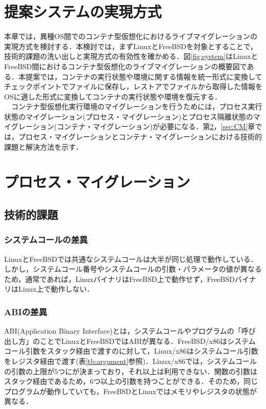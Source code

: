 \documentclass[11pt]{jarticle}
\begin{document}
\section{提案システムの実現方式}
\label{sec:suggest}
本章では，異種OS間でのコンテナ型仮想化におけるライブマイグレーションの実現方式を検討する．本検討では，まずLinuxとFreeBSDを対象とすることで，技術的課題の洗い出しと実現方式の有効性を確かめる．図\ref{fig:system}はLinuxとFreeBSD間におけるコンテナ型仮想化のライブマイグレーションの概要図である．本提案では，コンテナの実行状態や環境に関する情報を統一形式に変換してチェックポイントでファイルに保存し，レストアでファイルから取得した情報をOSに適した形式に変換してコンテナの実行状態や環境を復元する．\\
　コンテナ型仮想化実行環境のマイグレーションを行うためには，プロセス実行状態のマイグレーション(プロセス・マイグレーション)とプロセス隔離状態のマイグレーション(コンテナ・マイグレーション)が必要になる．第\ref{sec:PM}，\ref{sec:CM}章では，プロセス・マイグレーションとコンテナ・マイグレーションにおける技術的課題と解決方法を示す．


\section{プロセス・マイグレーション}
\label{sec:PM}
\subsection{技術的課題}
\subsubsection{システムコールの差異}
LinuxとFreeBSDでは共通なシステムコールは大半が同じ処理で動作している．しかし，システムコール番号やシステムコールの引数・パラメータの値が異なるため，通常であれば，LinuxバイナリはFreeBSD上で動作せず，FreeBSDバイナリはLinux上で動作しない．
\subsubsection{ABIの差異}
ABI(Application Binary Interface)とは，システムコールやプログラムの「呼び出し方」のことでLinuxとFreeBSDではABIが異なる．FreeBSD/x86はシステムコール引数をスタック経由で渡すのに対して，Linux/x86はシステムコール引数をレジスタ経由で渡す(表\ref{tb:argument}参照)\cite{hello}．Linux/x86では，システムコールの引数の上限が5つにが決まっており，それ以上は利用できない．関数の引数はスタック経由であるため，6つ以上の引数を持つことができる．そのため，同じプログラムが動作していても，FreeBSDとLinuxではメモリやレジスタの状態が異なる．
\end{document}
